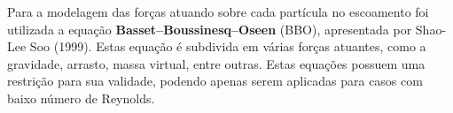 Para a modelagem das forças atuando sobre cada partícula no escoamento foi utilizada a equação \textbf{Basset–Boussinesq–Oseen} (BBO), apresentada por Shao-Lee Soo (1999)\cite{ShaoLeeSoo-1999}.
Estas equação é subdivida em várias forças atuantes, como a gravidade, arrasto, massa virtual, entre outras.
Estas equações possuem uma restrição para sua validade, podendo apenas serem aplicadas para casos com baixo número de Reynolds.